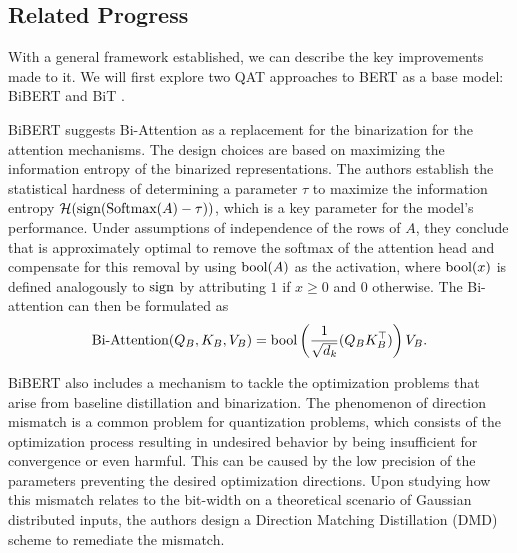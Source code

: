 \subsection{Related Progress}

With a general framework established, we can describe the key improvements made to it. We will first explore two QAT approaches to BERT as a base model:  BiBERT \cite{Qin2022bibert} and BiT \cite{liu2022bit}.

BiBERT suggests Bi-Attention as a replacement for the binarization for the attention mechanisms. The design choices are based on maximizing the information entropy of the binarized representations. The authors establish the statistical hardness of determining a parameter $\tau$ to maximize the information entropy $\mathcal{H}(\text{sign}(\text{Softmax}(A) - \tau))$, which is a key parameter for the model's performance. Under assumptions of independence of the rows of $A$, they conclude that is approximately optimal to remove the softmax of the attention head and compensate for this removal by using $\text{bool}(A)$ as the activation, where $\text{bool}(x)$ is defined analogously to $\text{sign}$ by attributing $1$ if $x \geq 0$ and $0$ otherwise. The Bi-attention can then be formulated as
\begin{equation}
    \text{Bi-Attention}(Q_B, K_B, V_B) = \text{bool} \left( \frac{1}{\sqrt{d_k}} (Q_B K_B^\top )\right) V_B.
\end{equation}

BiBERT also includes a mechanism to tackle the optimization problems that arise from baseline distillation and binarization. The phenomenon of direction mismatch is a common problem for quantization problems, which consists of the optimization process resulting in undesired behavior by being insufficient for convergence or even harmful. This can be caused by the low precision of the parameters preventing the desired optimization directions. Upon studying how this mismatch relates to the bit-width on a theoretical scenario of Gaussian distributed inputs, the authors design a Direction Matching Distillation (DMD) scheme to remediate the mismatch.

